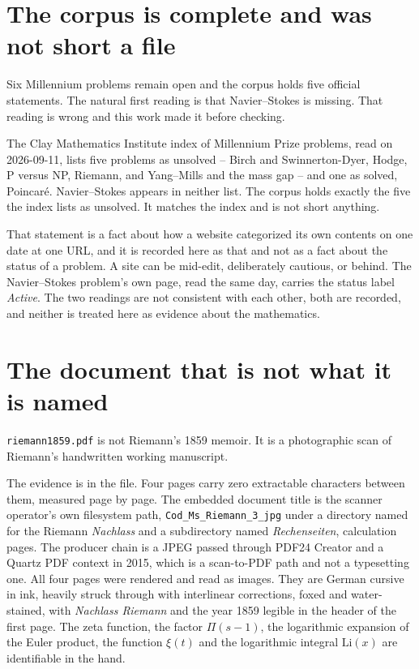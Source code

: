 \section{The corpus is complete and was not short a file}

Six Millennium problems remain open and the corpus holds five official statements. The natural
first reading is that Navier--Stokes is missing. That reading is wrong and this work made it before
checking.

The Clay Mathematics Institute index of Millennium Prize problems, read on 2026-09-11, lists five
problems as unsolved -- Birch and Swinnerton-Dyer, Hodge, P versus NP, Riemann, and Yang--Mills and
the mass gap -- and one as solved, Poincar\'e. Navier--Stokes appears in neither list. The corpus
holds exactly the five the index lists as unsolved. It matches the index and is not short anything.

That statement is a fact about how a website categorized its own contents on one date at one URL,
and it is recorded here as that and not as a fact about the status of a problem. A site can be
mid-edit, deliberately cautious, or behind. The Navier--Stokes problem's own page, read the same
day, carries the status label \emph{Active}. The two readings are not consistent with each other,
both are recorded, and neither is treated here as evidence about the mathematics.

\section{The document that is not what it is named}

\texttt{riemann1859.pdf} is not Riemann's 1859 memoir. It is a photographic scan of Riemann's
handwritten working manuscript.

The evidence is in the file. Four pages carry zero extractable characters between them, measured
page by page. The embedded document title is the scanner operator's own filesystem path,
\texttt{Cod\_\allowbreak{}Ms\_\allowbreak{}Riemann\_\allowbreak{}3\_\allowbreak{}jpg} under a
directory named for the Riemann \emph{Nachlass} and a subdirectory named
\emph{Rechenseiten}, calculation pages. The producer chain is a JPEG passed through PDF24 Creator
and a Quartz PDF context in 2015, which is a scan-to-PDF path and not a typesetting one. All four
pages were rendered and read as images. They are German cursive in ink, heavily struck through with
interlinear corrections, foxed and water-stained, with \emph{Nachlass Riemann} and the year 1859
legible in the header of the first page. The zeta function, the factor $\Pi(s-1)$, the logarithmic
expansion of the Euler product, the function $\xi(t)$ and the logarithmic integral $\mathrm{Li}(x)$
are identifiable in the hand.

